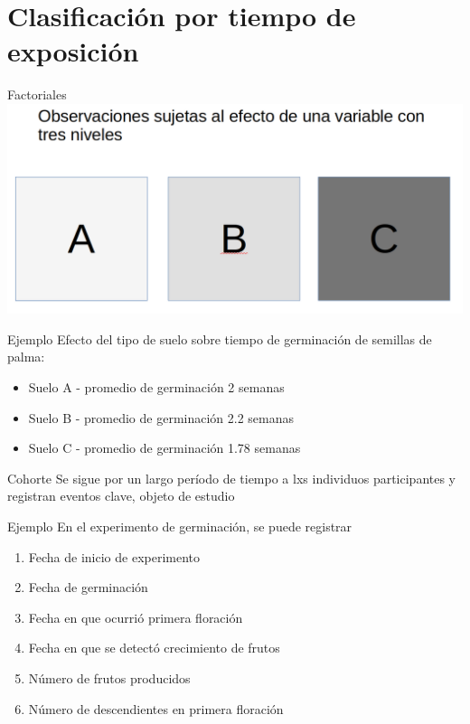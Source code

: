 \documentclass[
  11pt,
  ignorenonframetext,
]{beamer}
\providecommand{\tightlist}{%
  \setlength{\itemsep}{0pt}\setlength{\parskip}{0pt}}
\begin{document}
\hypertarget{clasificaciuxf3n-por-tiempo-de-exposiciuxf3n}{%
\section{Clasificación por tiempo de
exposición}\label{clasificaciuxf3n-por-tiempo-de-exposiciuxf3n}}

\begin{frame}{Factoriales}
\protect\hypertarget{factoriales}{}
\includegraphics{Figuras-disenos/Factoriales.png}
\end{frame}

\begin{frame}{Ejemplo}
\protect\hypertarget{ejemplo-1}{}
Efecto del tipo de suelo sobre tiempo de germinación de semillas de
palma:

\begin{itemize}
\tightlist
\item
  Suelo A - promedio de germinación 2 semanas
\item
  Suelo B - promedio de germinación 2.2 semanas
\item
  Suelo C - promedio de germinación 1.78 semanas
\end{itemize}
\end{frame}

\begin{frame}{Cohorte}
\protect\hypertarget{cohorte}{}
Se sigue por un largo período de tiempo a lxs individuos participantes y
registran eventos clave, objeto de estudio
\end{frame}

\begin{frame}{Ejemplo}
\protect\hypertarget{ejemplo-2}{}
En el experimento de germinación, se puede registrar

\begin{enumerate}
\tightlist
\item
  Fecha de inicio de experimento
\item
  Fecha de germinación
\item
  Fecha en que ocurrió primera floración
\item
  Fecha en que se detectó crecimiento de frutos
\item
  Número de frutos producidos
\item
  Número de descendientes en primera floración
\end{enumerate}
\end{frame}
\end{document}
